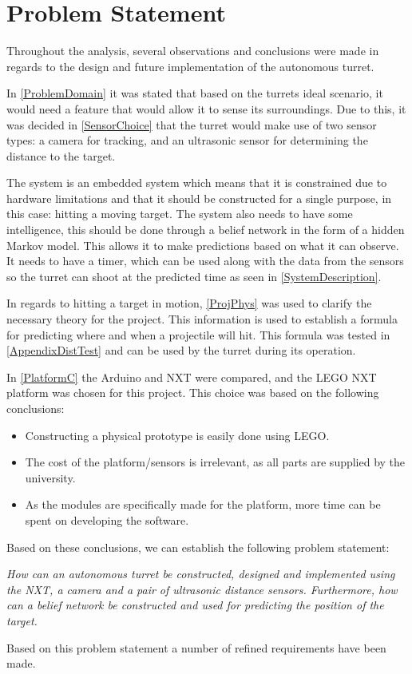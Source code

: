 \chapter{Problem Statement}

Throughout the analysis, several observations and conclusions were made in
regards to the design and future implementation of the autonomous turret. 

In \autoref{ProblemDomain} it was stated that based on the turrets ideal
scenario, it would need a feature that would allow it to sense its
surroundings. Due to this, it was decided in \autoref{SensorChoice} that the
turret would make use of two sensor types: a camera for tracking, and an
ultrasonic sensor for determining the distance to the target.\nl

The system is an embedded system which means that it is constrained due to
hardware limitations and that it should be constructed for a single purpose,
in this case: hitting a moving target. The system also needs to have some
intelligence, this should be done through a belief network in the form of a
hidden Markov model. This allows it to make predictions based on what it can
observe. It needs to have a timer, which can be used along with the data from
the sensors so the turret can shoot at the predicted time as seen in
\autoref{SystemDescription}.\nl

In regards to hitting a target in motion, \autoref{ProjPhys} was used to
clarify the necessary theory for the project. This information is used to
establish a formula for predicting where and when a projectile will hit. This
formula was tested in \autoref{AppendixDistTest} and can be used by the turret
during its operation.\nl

In \autoref{PlatformC} the Arduino and NXT were compared, and the LEGO NXT
platform was chosen for this project. This choice was
based on the following conclusions:
\begin{itemize}
  \item Constructing a physical prototype is easily done using LEGO.
  \item The cost of the platform/sensors is irrelevant, as all parts are
  supplied by the university.
  \item As the modules are specifically made for the platform, more time can be
  spent on developing the software.
\end{itemize}

Based on these conclusions, we can establish the following
problem statement:

\begin{center}
\begin{minipage}{0.8\linewidth}
\textit{How can an autonomous turret be constructed, designed and implemented
using the NXT, a camera and a pair of ultrasonic distance sensors. Furthermore,
how can a belief network be constructed and used for predicting the position
of the target.}
\end{minipage}
\end{center}

Based on this problem statement a number of refined requirements have been made.

